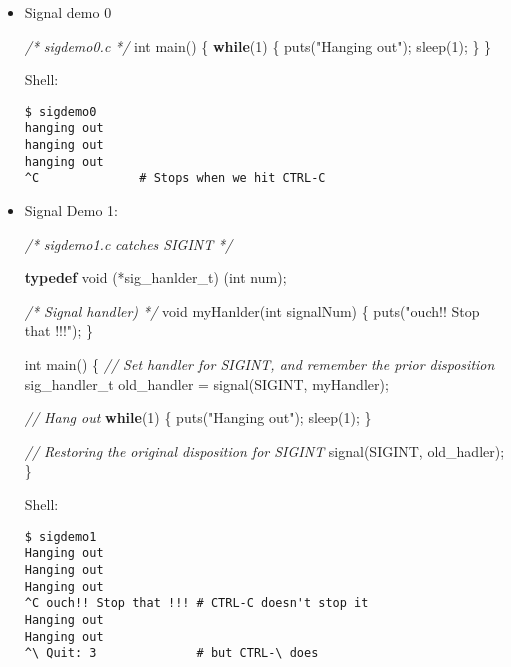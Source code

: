\documentclass[]{article}
\newenvironment{Shaded}{}{}
\newcommand{\KeywordTok}[1]{\textcolor[rgb]{0.00,0.44,0.13}{\textbf{#1}}}
\newcommand{\DataTypeTok}[1]{\textcolor[rgb]{0.56,0.13,0.00}{#1}}
\newcommand{\DecValTok}[1]{\textcolor[rgb]{0.25,0.63,0.44}{#1}}
\newcommand{\StringTok}[1]{\textcolor[rgb]{0.25,0.44,0.63}{#1}}
\newcommand{\CommentTok}[1]{\textcolor[rgb]{0.38,0.63,0.69}{\textit{#1}}}
\newcommand{\ControlFlowTok}[1]{\textcolor[rgb]{0.00,0.44,0.13}{\textbf{#1}}}
\newcommand{\NormalTok}[1]{#1}
\begin{document}
\begin{itemize}
\item
  Signal demo 0

\begin{Shaded}
\begin{Highlighting}[]
\CommentTok{/*}
\CommentTok{ sigdemo0.c}
\CommentTok{*/}
\DataTypeTok{int}\NormalTok{ main() \{}
    \ControlFlowTok{while}\NormalTok{(}\DecValTok{1}\NormalTok{) \{}
\NormalTok{        puts(}\StringTok{"Hanging out"}\NormalTok{);}
\NormalTok{        sleep(}\DecValTok{1}\NormalTok{);}
\NormalTok{    \}}
\NormalTok{\}}
\end{Highlighting}
\end{Shaded}

  Shell:

\begin{verbatim}
$ sigdemo0 
hanging out
hanging out
hanging out
^C				# Stops when we hit CTRL-C
\end{verbatim}
\item
  Signal Demo 1:

\begin{Shaded}
\begin{Highlighting}[]
\CommentTok{/*}
\CommentTok{ sigdemo1.c}
\CommentTok{ catches SIGINT}
\CommentTok{*/}

\KeywordTok{typedef} \DataTypeTok{void}\NormalTok{ (*sig_hanlder_t) (}\DataTypeTok{int}\NormalTok{ num);}

\CommentTok{/* Signal handler) */}
\DataTypeTok{void}\NormalTok{ myHanlder(}\DataTypeTok{int}\NormalTok{ signalNum) \{}
\NormalTok{    puts(}\StringTok{"ouch!! Stop that !!!"}\NormalTok{);}
\NormalTok{\}}

\DataTypeTok{int}\NormalTok{ main() \{}
    \CommentTok{// Set handler for SIGINT, and remember the prior disposition}
\NormalTok{    sig_handler_t old_handler = signal(SIGINT, myHandler);}

    \CommentTok{// Hang out}
    \ControlFlowTok{while}\NormalTok{(}\DecValTok{1}\NormalTok{) \{}
\NormalTok{        puts(}\StringTok{"Hanging out"}\NormalTok{);}
\NormalTok{        sleep(}\DecValTok{1}\NormalTok{);}
\NormalTok{    \}}

    \CommentTok{// Restoring the original disposition for SIGINT}
\NormalTok{    signal(SIGINT, old_hadler);}
\NormalTok{\}}
\end{Highlighting}
\end{Shaded}

  Shell:

\begin{verbatim}
$ sigdemo1
Hanging out
Hanging out
Hanging out
^C ouch!! Stop that !!! # CTRL-C doesn't stop it
Hanging out
Hanging out
^\ Quit: 3				# but CTRL-\ does
\end{verbatim}


\end{itemize}
\end{document}
